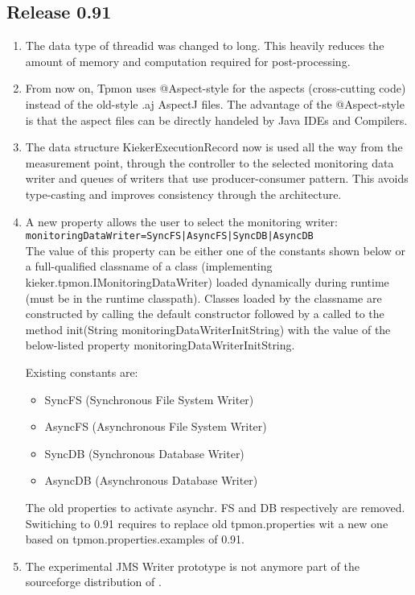 \documentclass{scrartcl}
\begin{document}
\subsection{Release 0.91}
\begin{enumerate}
\item The data type of threadid was changed to long. This heavily reduces the amount of memory and computation required for post-processing.
\item From now on, Tpmon uses  @Aspect-style for the aspects (cross-cutting code) instead of the old-style
    .aj AspectJ files. The advantage of the @Aspect-style is that the aspect files can be directly handeled by Java IDEs and Compilers.
\item The data structure KiekerExecutionRecord now is used all the way from the measurement point, through the controller to the selected monitoring data writer and queues of writers that use producer-consumer pattern. This avoids type-casting and improves consistency through the architecture.
\item  A new property allows the user to select the monitoring writer: \\
    \verb.monitoringDataWriter=SyncFS|AsyncFS|SyncDB|AsyncDB. \\
The value of this property can be either one of the constants shown below or a full-qualified
classname of a class (implementing kieker.tpmon.IMonitoringDataWriter) loaded
dynamically during runtime (must be in the runtime classpath). Classes loaded by
the classname are constructed by calling the default constructor followed by a
called to the method init(String monitoringDataWriterInitString) with the
value of the below-listed property monitoringDataWriterInitString.

Existing constants are:
\begin{itemize}
\item SyncFS (Synchronous File System Writer)
\item AsyncFS (Asynchronous File System Writer)
\item SyncDB (Synchronous Database Writer)
\item AsyncDB (Asynchronous Database Writer)
\end{itemize}
The old properties to activate asynchr. FS and DB respectively are removed. Switiching to
\tpmon{} 0.91 requires to replace old tpmon.properties wit a new one based on tpmon.properties.examples of 0.91.

\item The experimental JMS Writer prototype is not anymore part of the sourceforge distribution of \tpmon{}.
\end{enumerate}
\end{document}
